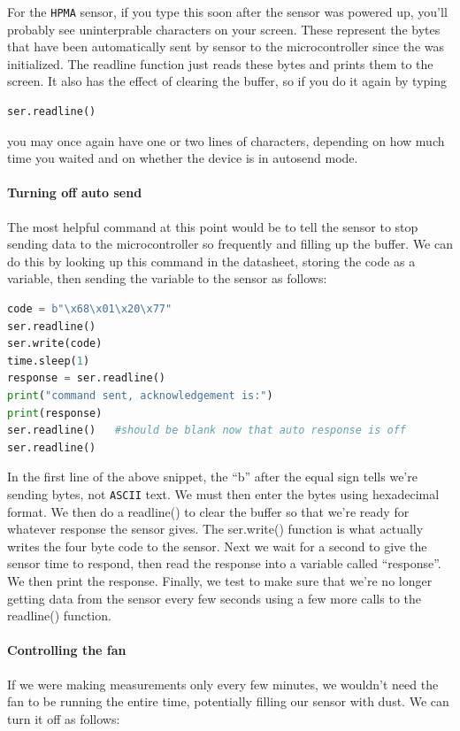 For the \texttt{HPMA} sensor, if you type this soon after the sensor was powered up, you’ll probably see uninterprable characters on your screen.
These represent the bytes that have been automatically sent by sensor to the microcontroller since the \uart was initialized.
The readline function just reads these bytes and prints them to the screen. It also has the effect of clearing the buffer, so if you do it again by typing

\begin{lstlisting}[language=Python]
ser.readline()
\end{lstlisting}

you may once again have one or two lines of characters, depending on how much time you waited and on whether the device is in autosend mode.

\paragraph{Turning off auto send}
The most helpful command at this point would be to tell the sensor to stop sending data to the microcontroller so frequently and filling up the \uart buffer.
We can do this by looking up this command in the datasheet, storing the code as a variable, then sending the variable to the sensor as follows:

\begin{lstlisting}[language=Python]
code = b"\x68\x01\x20\x77"
ser.readline()
ser.write(code)
time.sleep(1)
response = ser.readline()
print("command sent, acknowledgement is:")
print(response)
ser.readline()   #should be blank now that auto response is off
ser.readline()
\end{lstlisting}

In the first line of the above snippet, the “b” after the equal sign tells \Micropython we’re sending bytes, not \texttt{ASCII} text.
We must then enter the bytes using hexadecimal format.  We then do a readline() to clear the buffer so that we’re ready for whatever response the sensor gives.
The ser.write() function is what actually writes the four byte code to the sensor.
Next we wait for a second to give the sensor time to respond, then read the response into a variable called “response”.
We then print the response.  Finally, we test to make sure that we’re no longer getting data from the sensor every few seconds using a few more calls to the readline() function.

\paragraph{Controlling the fan}
If we were making measurements only every few minutes, we wouldn’t need the fan to be running the entire time, potentially filling our sensor with dust.  We can turn it off as follows:

